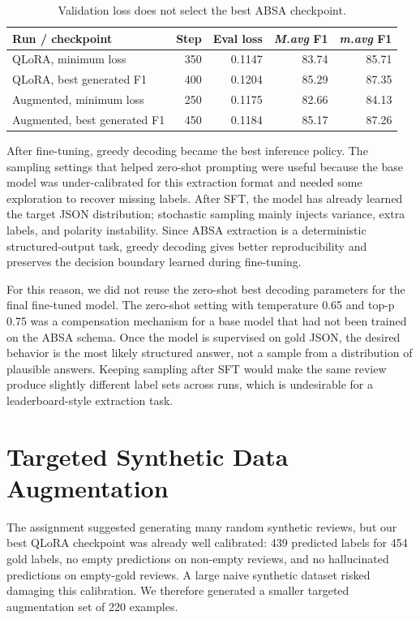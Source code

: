 \documentclass[11pt,a4paper]{article}
\newcommand{\mavg}{\textit{m.avg}}
\newcommand{\Mavg}{\textit{M.avg}}
\begin{document}
\begin{table}[H]
    \centering
    \small
    \setlength{\tabcolsep}{4pt}
    \caption{Validation loss does not select the best ABSA checkpoint.}
    \label{tab:loss_vs_f1}
    \begin{tabular}{@{}lrrrr@{}}
        \toprule
        Run / checkpoint & Step & Eval loss & \Mavg{} F1 & \mavg{} F1 \\
        \midrule
        QLoRA, minimum loss & 350 & 0.1147 & 83.74 & 85.71 \\
        QLoRA, best generated F1 & 400 & 0.1204 & 85.29 & 87.35 \\
        Augmented, minimum loss & 250 & 0.1175 & 82.66 & 84.13 \\
        Augmented, best generated F1 & 450 & 0.1184 & 85.17 & 87.26 \\
        \bottomrule
    \end{tabular}
\end{table}

After fine-tuning, greedy decoding became the best inference policy. The sampling settings that helped zero-shot prompting were useful because the base model was under-calibrated for this extraction format and needed some exploration to recover missing labels. After SFT, the model has already learned the target JSON distribution; stochastic sampling mainly injects variance, extra labels, and polarity instability. Since ABSA extraction is a deterministic structured-output task, greedy decoding gives better reproducibility and preserves the decision boundary learned during fine-tuning.

For this reason, we did not reuse the zero-shot best decoding parameters for the final fine-tuned model. The zero-shot setting with temperature 0.65 and top-p 0.75 was a compensation mechanism for a base model that had not been trained on the ABSA schema. Once the model is supervised on gold JSON, the desired behavior is the most likely structured answer, not a sample from a distribution of plausible answers. Keeping sampling after SFT would make the same review produce slightly different label sets across runs, which is undesirable for a leaderboard-style extraction task.

\section{Targeted Synthetic Data Augmentation}

The assignment suggested generating many random synthetic reviews, but our best QLoRA checkpoint was already well calibrated: 439 predicted labels for 454 gold labels, no empty predictions on non-empty reviews, and no hallucinated predictions on empty-gold reviews. A large naive synthetic dataset risked damaging this calibration. We therefore generated a smaller targeted augmentation set of 220 examples.
\end{document}
